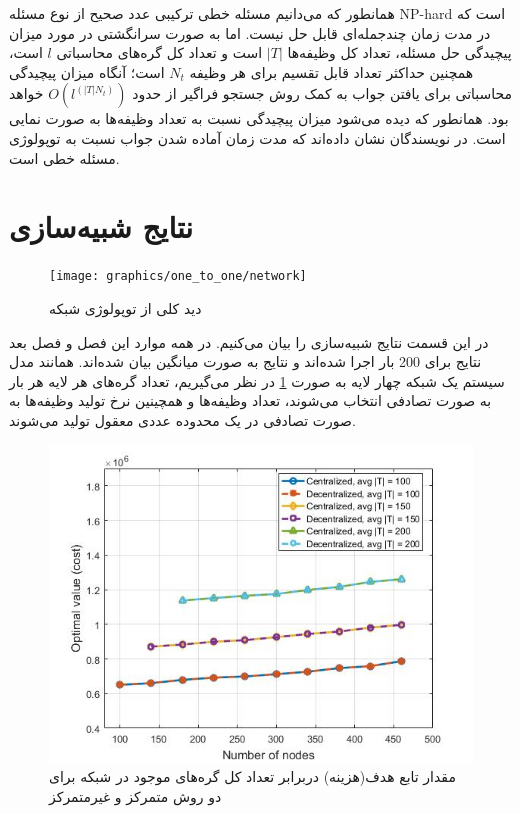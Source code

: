 	همانطور که می‌دانیم مسئله خطی ترکیبی عدد صحیح از نوع مسئله NP-hard است که در مدت زمان چندجمله‌ای قابل حل نیست. اما به صورت سرانگشتی در مورد میزان پیچیدگی حل مسئله، تعداد کل وظیفه‌ها $|T|$ است و تعداد کل گره‌های محاسباتی $l$ است، همچنین حداکثر تعداد قابل تقسیم برای هر وظیفه $N_t$ است؛ آنگاه میزان پیچیدگی محاسباتی برای یافتن جواب به کمک روش جستجو فراگیر از حدود $O(l^{(|T|N_t)})$ خواهد بود. همانطور که دیده می‌شود میزان پیچیدگی نسبت به تعداد وظیفه‌ها به صورت نمایی است. در \cite{vujanic2016decomposition} نویسندگان نشان داده‌اند که مدت زمان آماده شدن جواب نسبت به توپولوژی مسئله خطی است. 
	
\section{نتایج شبیه‌سازی}

\begin{figure}[h!]
	\centerline{\texttt{[image: graphics/one\_to\_one/network]}}
	\caption{دید کلی از توپولوژی شبکه}
	\label{fig:network}
\end{figure}

	در این قسمت نتایج شبیه‌سازی را بیان می‌کنیم. در همه موارد این فصل و فصل بعد نتایج برای 200 بار اجرا شده‌اند و نتایج به صورت میانگین بیان شده‌اند. همانند مدل سیستم یک شبکه چهار لایه به صورت \cref{fig:network} در نظر می‌گیریم، تعداد گره‌های هر لایه هر بار به صورت تصادفی انتخاب می‌شوند، تعداد وظیفه‌ها و همچینین نرخ تولید وظیفه‌ها به صورت تصادفی در یک محدوده عددی معقول تولید می‌شوند. 
\begin{figure}[h!]
	\centerline{\includegraphics[width=12cm]{graphics/3-cent-decent/optimization_value_per_number_of_nodes}}
	\caption{مقدار تابع هدف(هزینه) دربرابر تعداد کل گره‌های موجود در شبکه برای دو روش متمرکز و غیرمتمرکز}
	\label{fig:optimization_value_per_number_of_nodes}
\end{figure}

